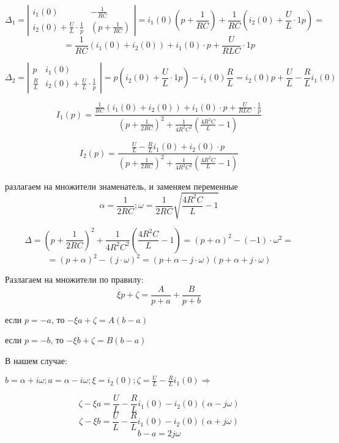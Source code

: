 \documentclass[a4paper,12pt]{article}
\begin{document}
$$
\Delta_1 = \left|
\begin{array}{cc}
	i_1(0) & - \frac{1}{RC} \\[1.5mm]
	i_2(0) +\frac{U}{L}\cdot\frac{1}{p}& \left(p + \frac{1}{RC}\right) 
\end{array}
\right| =
i_1(0)\left(p + \frac{1}{RC}\right) + \frac{1}{RC}\left(i_2(0) + \frac{U}{L}\cdot {1}{p}\right) =
$$
$$
= \frac{1}{RC}(i_1(0) + i_2(0)) + i_1(0)\cdot p + \frac{U}{RLC} \cdot{1}{p} 
$$

$$
\Delta_2 = \left|
\begin{array}{cc} p          & i_1(0) \\[1.5mm]
\frac{R}{L} & i_2(0) + \frac{U}{L}\cdot\frac{1}{p}
\end{array}\right| = p\left(i_2(0)+\frac{U}{L}\cdot{1}{p}\right) - i_1(0)\frac{R}{L} =
i_2(0)p + \frac{U}{L} - \frac{R}{L}i_1(0)
$$


$$
I_1(p) = \frac{\frac{1}{RC}(i_1(0)+i_2(0)) + i_1(0)\cdot p + \frac{U}{RLC}\cdot \frac{1}{p}}
{\left(p + \frac{1}{2RC}\right)^2 + \frac{1}{4R^2C^2}\left(\frac{4R^2C}{L} - 1\right)}
$$

$$
I_2(p) = \frac{\frac{U}{L}- \frac{R}{L}i_1(0) + i_2(0)\cdot p}
{\left(p + \frac{1}{2RC}\right)^2 + \frac{1}{4R^2C^2}\left(\frac{4R^2C}{L} - 1\right)}
$$

разлагаем на множители знаменатель, и заменяем переменные
$$
\alpha = \frac{1}{2RC}; \omega = \frac{1}{2RC}\sqrt{\frac{4R^2C}{L}-1}
$$

$$
\Delta = \left(p + \frac{1}{2RC}\right)^2 + \frac{1}{4R^2C^2}\left(\frac{4R^2C}{L} - 1\right) =
(p+\alpha)^2 - (-1)\cdot\omega^2 =
$$
$$
=(p+\alpha)^2 - (j\cdot\omega)^2 = (p + \alpha - j\cdot\omega)(p+\alpha+j\cdot\omega)
$$

Разлагаем на множители по правилу:
$$
\xi p + \zeta = \frac{A}{p+a} + \frac{B}{p+b}
$$

если $p=-a$, то $-\xi a + \zeta = A(b-a)$

если $p=-b$, то $-\xi b + \zeta = B(b-a)$

В нашем случае:

$b=\alpha+i\omega; a = \alpha-i\omega; \xi = i_2(0); \zeta=\frac{U}{L}-\frac{R}{L} i_1(0) \Rightarrow$ 

$$
\zeta - \xi a = \frac{U}{L}-\frac{R}{L} i_1(0) - i_2(0)(\alpha-j\omega)
$$
$$
\zeta-\xi b = \frac{U}{L}-\frac{R}{L} i_1(0) - i_2(0)(\alpha + j\omega)
$$
$$
b-a = 2j\omega
$$
\end{document}
